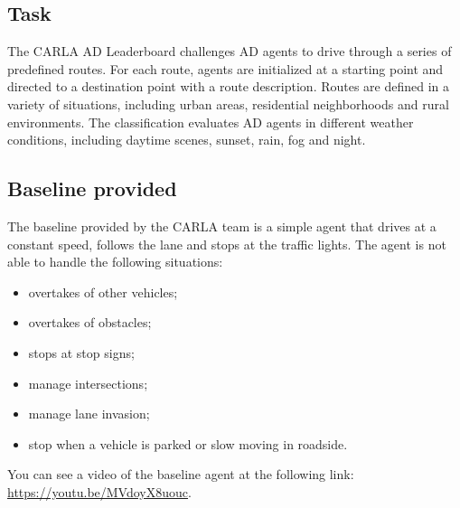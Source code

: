 \documentclass{article}
\begin{document}
\subsection{Task}
The CARLA AD Leaderboard challenges AD agents to drive through a series of predefined routes. For each route, 
agents are initialized at a starting point and directed to a destination point with a route description. 
Routes are defined in a variety of situations, including urban areas, residential neighborhoods and rural environments. 
The classification evaluates AD agents in different weather conditions, including daytime scenes, sunset, rain, fog and night.

\subsection{Baseline provided}
The baseline provided by the CARLA team is a simple agent that drives at a constant speed, follows the lane and stops at the traffic lights.
The agent is not able to handle the following situations:
\begin{itemize}
    \item overtakes of other vehicles;
    \item overtakes of obstacles;
    \item stops at stop signs;
    \item manage intersections;
    \item manage lane invasion;
    \item stop when a vehicle is parked or slow moving in roadside.
\end{itemize}

You can see a video of the baseline agent at the following link: \url{https://youtu.be/MVdoyX8uouc}.
\end{document}
